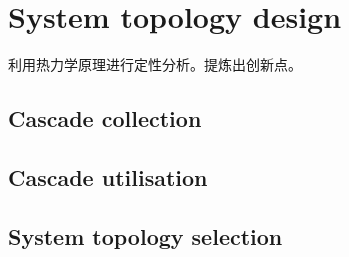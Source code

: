 \chapter{System topology design}
利用热力学原理进行定性分析。提炼出创新点。
\section{Cascade collection}
\section{Cascade utilisation}
\section{System topology selection}